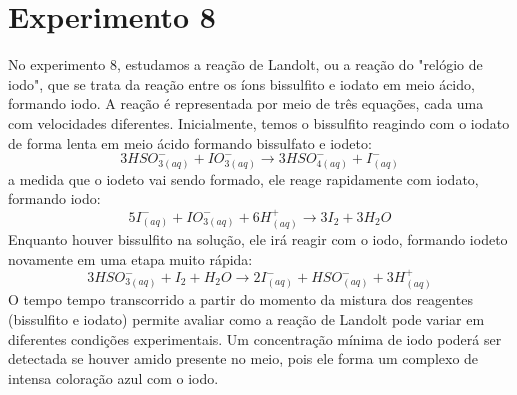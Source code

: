 \documentclass{article}
\begin{document}
\section{Experimento 8}
No experimento 8, estudamos a reação de Landolt, ou a reação do "relógio de iodo", que se trata da reação entre os íons bissulfito e iodato em meio ácido, formando iodo. A reação é representada por meio de três equações, cada uma com velocidades diferentes.
Inicialmente, temos o bissulfito reagindo com o iodato de forma lenta em meio ácido formando bissulfato e iodeto:
\begin{equation}
  3HSO_{3(aq)}^-  + IO_{3(aq)}^- \rightarrow 3HSO_{4(aq)}^- + I_{(aq)}^-
\end{equation}
a medida que o iodeto vai sendo formado, ele reage rapidamente com iodato, formando iodo:
\begin{equation}
  5I^-_{(aq)} + IO^-_{3(aq)}+6H^+_{(aq)}\rightarrow 3I_2+3H_2O
\end{equation}
Enquanto houver bissulfito na solução, ele irá reagir com o iodo, formando iodeto novamente em uma etapa muito rápida:
\begin{equation}
  3HSO^-_{3(aq)}+I_2+H_2O \rightarrow 2I^-_{(aq)}+HSO^-_{(aq)}+3H^+_{(aq)}
\end{equation}
O tempo tempo transcorrido a partir do momento da mistura dos reagentes (bissulfito e iodato) permite avaliar como a reação de Landolt pode variar em diferentes condições experimentais. Um concentração mínima de iodo poderá ser detectada se houver amido presente no meio, pois ele forma um complexo de intensa coloração azul com o iodo.
\end{document}
